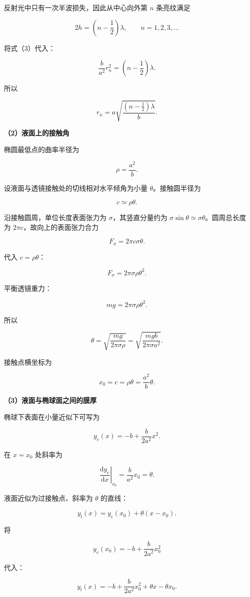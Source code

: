 \documentclass[12pt,a4paper,UTF8]{ctexart}
\begin{document}
反射光中只有一次半波损失，因此从中心向外第 \(n\) 条亮纹满足

\[
2h=\left(n-\frac12\right)\lambda,
\qquad n=1,2,3,\ldots
\tag{4}
\]

将式（3）代入：

\[
\frac{b}{a^2}r_n^2
=\left(n-\frac12\right)\lambda.
\]

所以

\[
\boxed{
r_n
=a\sqrt{\frac{(n-\frac12)\lambda}{b}}
}.
\tag{5}
\]

\textbf{（2）液面上的接触角}

椭圆最低点的曲率半径为

\[
\rho=\frac{a^2}{b}.
\tag{6}
\]

设液面与透镜接触处的切线相对水平倾角为小量 \(\theta\)。接触圆半径为

\[
c\simeq\rho\theta.
\tag{7}
\]

沿接触圆周，单位长度表面张力为 \(\sigma\)，其竖直分量约为
\(\sigma\sin\theta\simeq\sigma\theta\)。圆周总长度为
\(2\pi c\)，故向上的表面张力合力

\[
F_\sigma
=2\pi c\sigma\theta.
\tag{8}
\]

代入 \(c=\rho\theta\)：

\[
F_\sigma=2\pi\sigma\rho\theta^2.
\tag{9}
\]

平衡透镜重力：

\[
mg=2\pi\sigma\rho\theta^2.
\tag{10}
\]

所以

\[
\theta
=\sqrt{\frac{mg}{2\pi\sigma\rho}}
=\sqrt{\frac{mgb}{2\pi\sigma a^2}}.
\tag{11}
\]

接触点横坐标为

\[
x_0=c=\rho\theta=\frac{a^2}{b}\theta.
\tag{12}
\]

\textbf{（3）液面与椭球面之间的膜厚}

椭球下表面在小量近似下可写为

\[
y_e(x)=-b+\frac{b}{2a^2}x^2.
\tag{13}
\]

在 \(x=x_0\) 处斜率为

\[
\left.\frac{\mathrm dy_e}{\mathrm dx}\right|_{x_0}
=\frac{b}{a^2}x_0
=\theta.
\tag{14}
\]

液面近似为过接触点、斜率为 \(\theta\) 的直线：

\[
y_l(x)
=y_e(x_0)+\theta(x-x_0).
\tag{15}
\]

将

\[
y_e(x_0)=-b+\frac{b}{2a^2}x_0^2
\]

代入：

\[
y_l(x)
=-b+\frac{b}{2a^2}x_0^2+\theta x-\theta x_0.
\tag{16}
\]
\end{document}

